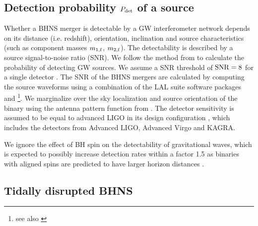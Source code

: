 \documentclass[twocolumn]{aastex63}
\newcommand{\floor}[1]{\textbf{\textcolor{magenta}{[Floor: #1]}}}
\newcommand\bhnsSingle{BHNS\xspace}
\newcommand{\monef}{\ensuremath{m_{1,\rm{f}}}\xspace}
\newcommand{\mtwof}{\ensuremath{m_{2,\rm{f}}}\xspace}
\newcommand{\Pdet}{\ensuremath{{P}_{\rm{det}}}\xspace}
\begin{document}
%


\subsection{Detection probability  \Pdet of a source}
\label{subsec:detection-probability}
%

Whether a \bhnsSingle merger is detectable by a \ac{GW} interferometer network depends on its distance (i.e. redshift), orientation, inclination and source characteristics (such as component masses \monef, \mtwof).  
The detectability is described by a source signal-to-noise ratio (SNR). 
We follow the method from \citet{2018MNRAS.477.4685B} to calculate the probability of detecting \ac{GW} sources. We assume a SNR  threshold of ${\rm{SNR}} = 8$ for a single detector \citep{1993PhRvD..47.2198F}. %
The  SNR of the \bhnsSingle mergers are calculated by computing the source waveforms  using a combination of the LAL suite software packages {} \citep{2014PhRvL.113o1101H,2016PhRvD..93d4006H,2016PhRvD..93d4007K} and {} \citep{2014PhRvD..89h4006P,2017PhRvD..95b4010B}\footnote{see also \citet{lalsuite}}. %
We marginalize over the sky localization and source orientation of the binary using the antenna pattern function from \citet{1993PhRvD..47.2198F}. The detector sensitivity is assumed to be equal to advanced LIGO in its design configuration \citep{2015CQGra..32g4001L,2016LRR....19....1A, 2018LRR....21....3A}, which includes the detectors from Advanced LIGO, Advanced Virgo and KAGRA.

We ignore the effect of \ac{BH} spin on the detectability of gravitational waves, which is expected to possibly increase  detection rates within a factor 1.5 \citep{2018PhRvD..98h4036G} as binaries with aligned spins are predicted to have larger  horizon distances \citep{2006PhRvD..74d1501C,2015CQGra..32j5009S}. 


\subsection{Tidally disrupted  BHNS}
\label{subsec:method-tidal-disruption-BHNS}
%

\end{document}
